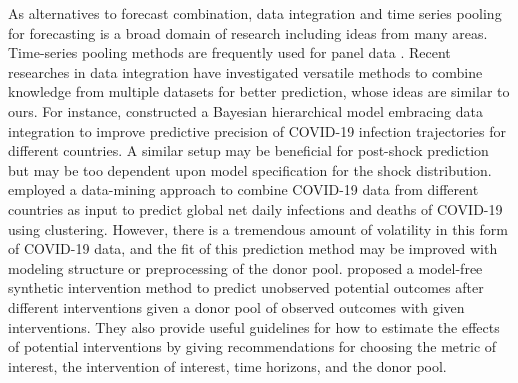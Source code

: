 \documentclass[11pt]{article}
\theoremstyle{definition}
\begin{document}


As alternatives to forecast combination, data integration and time series pooling for forecasting is a broad domain of research including ideas from many areas. Time-series pooling methods are frequently used for panel data \citep{zellner1991forecasting, hoogstrate2000pooling, baltagi2008forecasting, fosten2019panel, liu2020forecasting}.  Recent researches in data integration have investigated versatile methods to combine knowledge from multiple datasets for better prediction, whose ideas are similar to ours. For instance, \citet{lee2020estimation} constructed a Bayesian hierarchical model embracing data integration %
to improve predictive precision of COVID-19 infection trajectories for different countries. A similar setup may be beneficial for post-shock prediction but may be too dependent upon model specification for the shock distribution.
  \citet{plessen2020integrated} employed a data-mining approach to combine COVID-19 data from different countries as input to predict global net daily infections and deaths of COVID-19 using clustering. However, there is a tremendous amount of volatility in this form of COVID-19 data, and the fit of this prediction method may be improved with modeling structure or preprocessing of the donor pool. %
\citet{agarwal2020two} proposed a model-free synthetic intervention method to predict unobserved potential outcomes after different interventions given a donor pool of observed outcomes with given interventions. They also provide useful guidelines for how to estimate the effects of potential interventions by giving recommendations for choosing the metric of interest, the intervention of interest, time horizons, and the donor pool.
\end{document}
